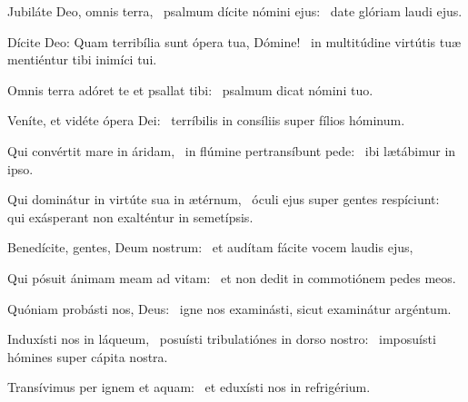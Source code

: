 \item Jubiláte Deo, omnis terra,~\pscross{} psalmum dícite nómini ejus:~\psstar{} date glóriam laudi ejus.

\item Dícite Deo: Quam terribília sunt ópera tua, Dómine!~\psstar{} in multitúdine virtútis tuæ mentiéntur tibi inimíci tui.

\item Omnis terra adóret te et psallat tibi:~\psstar{} psalmum dicat nómini tuo.

\item Veníte, et vidéte ópera Dei:~\psstar{} terríbilis in consíliis super fílios hóminum.

\item Qui convértit mare in áridam,~\pscross{} in flúmine pertransíbunt pede:~\psstar{} ibi lætábimur in ipso.

\item Qui dominátur in virtúte sua in ætérnum,~\pscross{} óculi ejus super gentes respíciunt:~\psstar{} qui exásperant non exalténtur in semetípsis.

\item Benedícite, gentes, Deum nostrum:~\psstar{} et audítam fácite vocem laudis ejus,

\item Qui pósuit ánimam meam ad vitam:~\psstar{} et non dedit in commotiónem pedes meos.

\item Quóniam probásti nos, Deus:~\psstar{} igne nos examinásti, sicut examinátur argéntum.

\item Induxísti nos in láqueum,~\pscross{} posuísti tribulatiónes in dorso nostro:~\psstar{} imposuísti hómines super cápita nostra.

\item Transívimus per ignem et aquam:~\psstar{} et eduxísti nos in refrigérium.
